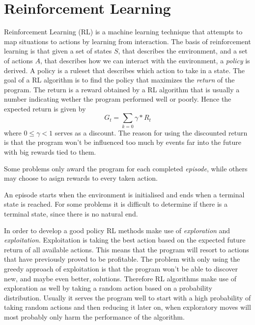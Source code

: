 \documentclass[11pt]{article}
\begin{document}
\maketitle

\section{Reinforcement Learning}

Reinforcement Learning (RL) is a machine learning technique that attempts 
to map situations to actions by learning from interaction.
The basis of reinforcement learning is that given a set of states $S$, that describes the environment,
and a set of actions $A$, that describes how we can interact with the environment,
a \textit{policy} is derived.
A policy is a ruleset that describes which action to take in a state.
The goal of a RL algorithm is to find the policy that
maximizes the \textit{return} of the program.
The return is a reward obtained by a RL algorithm that is usually a number indicating
wether the program performed well or poorly.
Hence the expected return is given by
\begin{equation}
    G_t = \sum\limits_{k=0} \gamma * R_{t}
\end{equation}
where $0 \leq \gamma < 1$ serves as a discount.
The reason for using the discounted return is that the program won't be influenced
too much by events far into the future with big rewards tied to them.

Some problems only award the program for each completed \textit{episode},
while others may choose to asign rewards to every taken action.

An episode starts when the environment is initialised and ends when a terminal state is reached.
For some problems it is difficult to determine if there is a terminal state, since there
is no natural end.

In order to develop a good policy RL methods make use of \textit{exploration} and \textit{exploitation}.
Exploitation is taking the best action based on the expected future return of all available actions.
This means that the program will resort to actions that have previously proved to be profitable.
The problem with only using the greedy approach of exploitation is that the program won't be able
to discover new, and maybe even better, solutions.
Therefore RL algorithms make use of exploration as well by taking a random action based
on a probability distribution.
Usually it serves the program well to start with a high probability of taking random actions
and then reducing it later on, when exploratory moves will most probably only harm the
performance of the algorithm.
\end{document}

